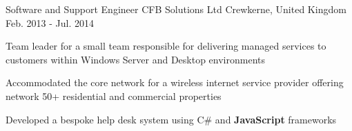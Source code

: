 \begin{cventries}
  \cventry
    {Software and Support Engineer} %
    {CFB Solutions Ltd} %
    {Crewkerne, United Kingdom} %
    {Feb. 2013 - Jul. 2014} %
    {
      \begin{cvitems} %
        \item {Team leader for a small team responsible for delivering managed services to customers within Windows Server and Desktop environments}
        \item {Accommodated the core network for a wireless internet service provider offering network 50+ residential and commercial properties}
        \item {Developed a bespoke help desk system using C\# and \textbf{JavaScript} frameworks}
      \end{cvitems}
    }

\end{cventries}
